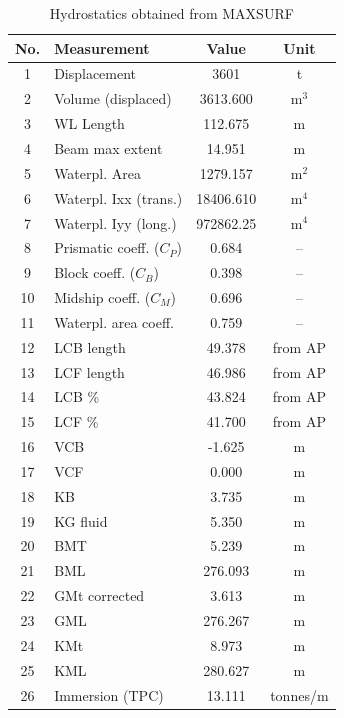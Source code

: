 \documentclass[12pt,a4paper,twoside]{report}
\begin{document}
\begin{table}[H]
\centering
\caption{Hydrostatics obtained from MAXSURF}
\label{tab:hydrostatics_dwl}
\renewcommand{\arraystretch}{1.15}
\begin{tabular}{c l c c}
\hline
\textbf{No.} & \textbf{Measurement} & \textbf{Value} & \textbf{Unit} \\
\hline
1  & Displacement              & 3601       & t \\
2  & Volume (displaced)        & 3613.600   & m$^3$ \\
3  & WL Length                 & 112.675    & m \\
4  & Beam max extent           & 14.951     & m \\
5  & Waterpl. Area             & 1279.157   & m$^2$ \\
6  & Waterpl. Ixx (trans.)     & 18406.610  & m$^4$ \\
7  & Waterpl. Iyy (long.)      & 972862.25  & m$^4$ \\
8  & Prismatic coeff. ($C_P$)  & 0.684      & -- \\
9  & Block coeff. ($C_B$)      & 0.398      & -- \\
10 & Midship coeff. ($C_M$)    & 0.696      & -- \\
11 & Waterpl. area coeff.      & 0.759      & -- \\
12 & LCB length                & 49.378     & from AP \\
13 & LCF length                & 46.986     & from AP \\
14 & LCB \%                    & 43.824     & from AP \\
15 & LCF \%                    & 41.700     & from AP \\
16 & VCB                       & -1.625     & m \\
17 & VCF                       & 0.000      & m \\
18 & KB                        & 3.735      & m \\
19 & KG fluid                  & 5.350      & m \\
20 & BMT                       & 5.239      & m \\
21 & BML                       & 276.093    & m \\
22 & GMt corrected             & 3.613      & m \\
23 & GML                       & 276.267    & m \\
24 & KMt                       & 8.973      & m \\
25 & KML                       & 280.627    & m \\
26 & Immersion (TPC)           & 13.111     & tonnes/m \\
\hline
\end{tabular}
\end{table}
\end{document}
